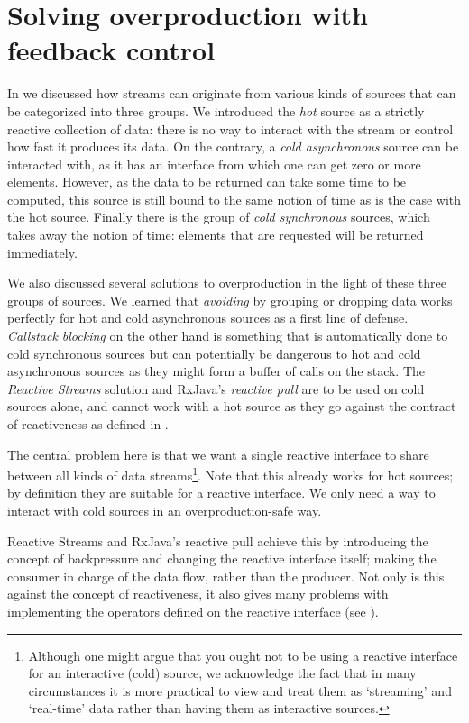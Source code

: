 \chapter{Solving overproduction with feedback control}
\label{chap:solving-overproduction}

In  we discussed how streams can originate from various kinds of sources that can be categorized into three groups. We introduced the \textit{hot} source as a strictly reactive collection of data: there is no way to interact with the stream or control how fast it produces its data. On the contrary, a \textit{cold asynchronous} source can be interacted with, as it has an interface from which one can get zero or more elements. However, as the data to be returned can take some time to be computed, this source is still bound to the same notion of time as is the case with the hot source. Finally there is the group of \textit{cold synchronous} sources, which takes away the notion of time: elements that are requested will be returned immediately.

We also discussed several solutions to overproduction in the light of these three groups of sources. We learned that \textit{avoiding} by grouping or dropping data works perfectly for hot and cold asynchronous sources as a first line of defense. \textit{Callstack blocking} on the other hand is something that is automatically done to cold synchronous sources but can potentially be dangerous to hot and cold asynchronous sources as they might form a buffer of calls on the stack. The \textit{Reactive Streams} solution and RxJava's \textit{reactive pull} are to be used on cold sources alone, and cannot work with a hot source as they go against the contract of reactiveness as defined in \cite{berry1989-Reactive}.

The central problem here is that we want a single reactive interface to share between all kinds of data streams\footnote{Although one might argue that you ought not to be using a reactive interface for an interactive (cold) source, we acknowledge the fact that in many circumstances it is more practical to view and treat them as `streaming' and `real-time' data rather than having them as interactive sources.}. Note that this already works for hot sources; by definition they are suitable for a reactive interface. We only need a way to interact with cold sources in an overproduction-safe way.

Reactive Streams and RxJava's reactive pull achieve this by introducing the concept of backpressure and changing the reactive interface itself; making the consumer in charge of the data flow, rather than the producer. Not only is this against the concept of reactiveness, it also gives many problems with implementing the operators defined on the reactive interface (see ).

